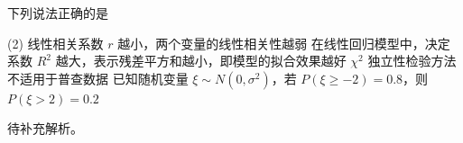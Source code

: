 \begin{choice}[source={2025雅礼月考八（多选）}, topic={统计概念辨析}]
下列说法正确的是
\begin{tasks}(2)
	\task 线性相关系数 $r$ 越小，两个变量的线性相关性越弱
	\task 在线性回归模型中，决定系数 $R^2$ 越大，表示残差平方和越小，即模型的拟合效果越好
	\task $\chi^2$ 独立性检验方法不适用于普查数据
	\task 已知随机变量 $\xi \sim N(0, \sigma^2)$，若 $P(\xi \ge -2) = 0.8$，则 $P(\xi > 2) = 0.2$
\end{tasks}
\end{choice}
\begin{choice-sol}
待补充解析。
\end{choice-sol}
